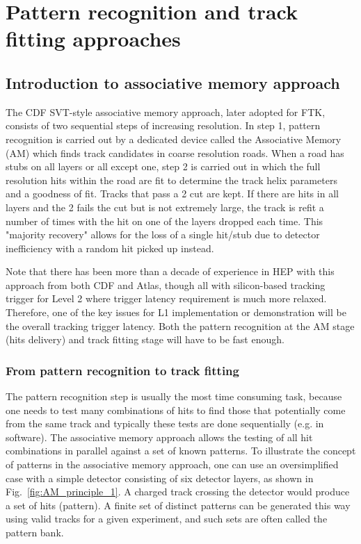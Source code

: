 \section{Pattern recognition and track fitting approaches}

\subsection{Introduction to associative memory approach}

\noindent The CDF SVT-style associative memory approach, later adopted for FTK, consists of two sequential steps of increasing resolution.  In step 1, pattern recognition is carried out by a dedicated device called the Associative Memory (AM) which finds track candidates in coarse resolution roads.  When a road has stubs on all layers or all except one, step 2 is carried out in which the full resolution hits within the road are fit to determine the track helix parameters and a goodness of fit.  Tracks that pass a  2 cut are kept.  If there are hits in all layers and the  2 fails the cut but is not extremely large, the track is refit a number of times with the hit on one of the layers dropped each time.  This "majority recovery" allows for the loss of a single hit/stub due to detector inefficiency with a random hit picked up instead. 

\noindent Note that there has been more than a decade of experience in HEP with this approach from both CDF and Atlas, though all with silicon-based tracking trigger for Level 2 where trigger latency requirement is much more relaxed.  Therefore, one of the key issues for L1 implementation or demonstration will be the overall tracking trigger latency. Both the pattern recognition at the AM stage (hits delivery) and track fitting stage will have to be fast enough.


\subsubsection{From pattern recognition to track fitting}

\noindent The pattern recognition step is usually the most time consuming task, because one needs to test many combinations of hits to find those that potentially come from the same track and typically these tests are done sequentially (e.g. in software). The associative memory approach allows the testing of all hit combinations in parallel against a set of known patterns. To illustrate the concept of patterns in the associative memory approach, one can use an oversimplified case with a simple detector consisting of six detector layers, as shown in Fig.~\ref{fig:AM_principle_1}. A charged track crossing the detector would produce a set of hits (pattern). A finite set of distinct patterns can be generated this way using valid tracks for a given experiment, and such sets are often called the pattern bank. 

